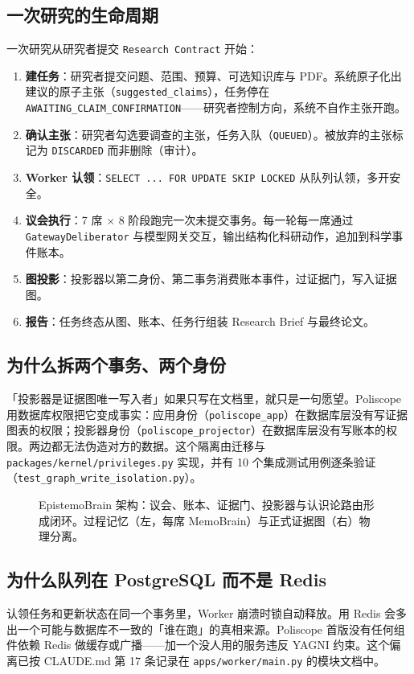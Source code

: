 \subsection{一次研究的生命周期}

一次研究从研究者提交 \texttt{Research Contract} 开始：

\begin{enumerate}
\item \textbf{建任务}：研究者提交问题、范围、预算、可选知识库与 PDF。系统原子化出建议的原子主张（\texttt{suggested\_claims}），任务停在 \texttt{AWAITING\_CLAIM\_CONFIRMATION}——研究者控制方向，系统不自作主张开跑。
\item \textbf{确认主张}：研究者勾选要调查的主张，任务入队（\texttt{QUEUED}）。被放弃的主张标记为 \texttt{DISCARDED} 而非删除（审计）。
\item \textbf{Worker 认领}：\texttt{SELECT ... FOR UPDATE SKIP LOCKED} 从队列认领，多开安全。
\item \textbf{议会执行}：7 席 $\times$ 8 阶段跑完一次未提交事务。每一轮每一席通过 \texttt{GatewayDeliberator} 与模型网关交互，输出结构化科研动作，追加到科学事件账本。
\item \textbf{图投影}：投影器以第二身份、第二事务消费账本事件，过证据门，写入证据图。
\item \textbf{报告}：任务终态从图、账本、任务行组装 Research Brief 与最终论文。
\end{enumerate}

\subsection{为什么拆两个事务、两个身份}

「投影器是证据图唯一写入者」如果只写在文档里，就只是一句愿望。Poliscope 用数据库权限把它变成事实：应用身份（\texttt{poliscope\_app}）在数据库层没有写证据图表的权限；投影器身份（\texttt{poliscope\_projector}）在数据库层没有写账本的权限。两边都无法伪造对方的数据。这个隔离由迁移与 \texttt{packages/kernel/privileges.py} 实现，并有 10 个集成测试用例逐条验证（\texttt{test\_graph\_write\_isolation.py}）。

\begin{figure}[h]
\centering
{}
\caption{EpistemoBrain 架构：议会、账本、证据门、投影器与认识论路由形成闭环。过程记忆（左，每席 MemoBrain）与正式证据图（右）物理分离。}
\end{figure}

\subsection{为什么队列在 PostgreSQL 而不是 Redis}

认领任务和更新状态在同一个事务里，Worker 崩溃时锁自动释放。用 Redis 会多出一个可能与数据库不一致的「谁在跑」的真相来源。Poliscope 首版没有任何组件依赖 Redis 做缓存或广播——加一个没人用的服务违反 YAGNI 约束。这个偏离已按 CLAUDE.md 第 17 条记录在 \texttt{apps/worker/main.py} 的模块文档中。
